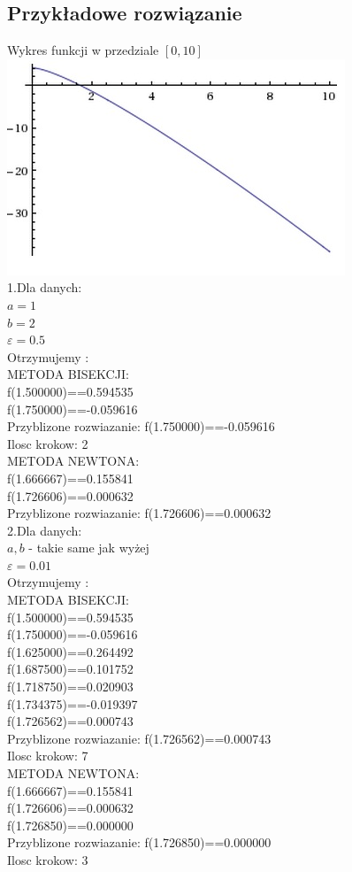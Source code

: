 \documentclass[11pt]{article} %
\begin{document}
\subsection {Przykładowe rozwiązanie}
Wykres funkcji w przedziale $[0,10]$\\
\includegraphics {Funkcja.jpg}\\
1.Dla danych:\\
$a=1$\\
$b=2$\\
$\varepsilon = 0.5$\\
Otrzymujemy :\\
METODA BISEKCJI:\\
f(1.500000)==0.594535\\
f(1.750000)==-0.059616\\
Przyblizone rozwiazanie: f(1.750000)==-0.059616\\
Ilosc krokow: 2\\
METODA NEWTONA:\\
f(1.666667)==0.155841\\
f(1.726606)==0.000632\\
Przyblizone rozwiazanie: f(1.726606)==0.000632\\
2.Dla danych:\\
$a,b$ - takie same jak wyżej \\
$\varepsilon = 0.01$\\
Otrzymujemy :\\
METODA BISEKCJI:\\
f(1.500000)==0.594535\\
f(1.750000)==-0.059616\\
f(1.625000)==0.264492\\
f(1.687500)==0.101752\\
f(1.718750)==0.020903\\
f(1.734375)==-0.019397\\
f(1.726562)==0.000743\\
Przyblizone rozwiazanie: f(1.726562)==0.000743\\
Ilosc krokow: 7\\
METODA NEWTONA:\\
f(1.666667)==0.155841\\
f(1.726606)==0.000632\\
f(1.726850)==0.000000\\
Przyblizone rozwiazanie: f(1.726850)==0.000000\\
Ilosc krokow: 3\\
\end{document}
